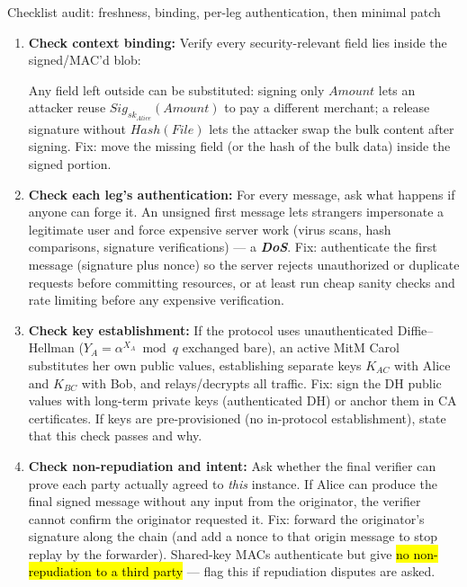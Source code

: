 \documentclass[12pt, a4paper]{article}
\newcommand{\term}[1]{\textbf{\textit{#1}}}        %
\newcommand{\imp}[1]{\hl{#1}}                       %
\begin{document}
\begin{schemebox}{Checklist audit: freshness, binding, per-leg authentication, then minimal patch}
\begin{enumerate}[label=\textbf{Step \arabic*:}, leftmargin=*]
    \imp{Fix: signed nonce or timestamp, receiver rejects stale/reused values.} An unsigned nonce is useless --- it can be swapped along with the replayed signature.
    \item \textbf{Check context binding:} Verify every security-relevant field lies inside the signed/MAC'd blob:
Any field left outside can be substituted: signing only $Amount$ lets an attacker reuse $Sig_{sk_{Alice}}(Amount)$ to pay a different merchant; a release signature without $Hash(File)$ lets the attacker swap the bulk content after signing. Fix: move the missing field (or the hash of the bulk data) inside the signed portion.
    \item \textbf{Check each leg's authentication:} For every message, ask what happens if anyone can forge it. An unsigned first message lets strangers impersonate a legitimate user and force expensive server work (virus scans, hash comparisons, signature verifications) --- a \term{DoS}.
    Fix: authenticate the first message (signature plus nonce) so the server rejects unauthorized or duplicate requests before committing resources, or at least run cheap sanity checks and rate limiting before any expensive verification.
    \item \textbf{Check key establishment:} If the protocol uses unauthenticated Diffie--Hellman ($Y_A = \alpha^{X_A} \bmod q$ exchanged bare), an active MitM Carol substitutes her own public values, establishing separate keys $K_{AC}$ with Alice and $K_{BC}$ with Bob, and relays/decrypts all traffic.
    Fix: sign the DH public values with long-term private keys (authenticated DH) or anchor them in CA certificates. If keys are pre-provisioned (no in-protocol establishment), state that this check passes and why.
    \item \textbf{Check non-repudiation and intent:} Ask whether the final verifier can prove each party actually agreed to \emph{this} instance. If Alice can produce the final signed message without any input from the originator, the verifier cannot confirm the originator requested it.
    Fix: forward the originator's signature along the chain (and add a nonce to that origin message to stop replay by the forwarder).
    Shared-key MACs authenticate but give \imp{no non-repudiation to a third party} --- flag this if repudiation disputes are asked.

\end{enumerate}
\end{schemebox}
\end{document}
